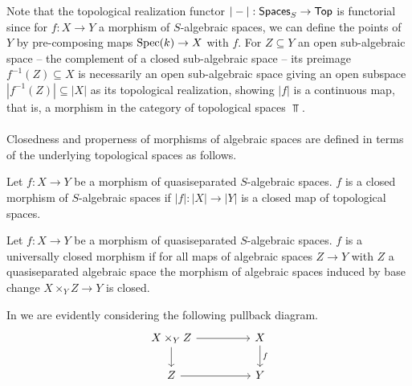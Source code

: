 Note that the topological realization functor $|-|:\mathsf{Spaces}_{S}\to\mathsf{Top}$ is functorial since for $f:X\to Y$ a morphism of $S$-algebraic spaces, we can define the points of $Y$ by pre-composing maps $\operatorname{Spec}(k)\to X$ with $f$. For $Z\subseteq Y$ an open sub-algebraic space -- the complement of a closed sub-algebraic space -- its preimage $f^{-1}(Z)\subseteq X$ is necessarily an open sub-algebraic space giving an open subspace $|f^{-1}(Z)|\subseteq|X|$ as its topological realization, showing $|f|$ is a continuous map, that is, a morphism in the category of topological spaces $\Top$. 
\\\\
Closedness and properness of morphisms of algebraic spaces are defined in terms of the underlying topological spaces as follows. 
\begin{definition}\label{def: closed morphism of algebraic spaces}
    Let $f:X\to Y$ be a morphism of quasiseparated $S$-algebraic spaces. $f$ is a closed morphism of $S$-algebraic spaces if $|f|:|X|\to|Y|$ is a closed map of topological spaces. 
\end{definition}
\begin{definition}\label{def: universally closed morphism of algebraic spaces}
    Let $f:X\to Y$ be a morphism of quasiseparated $S$-algebraic spaces. $f$ is a universally closed morphism if for all maps of algebraic spaces $Z\to Y$ with $Z$ a quasiseparated algebraic space the morphism of algebraic spaces induced by base change $X\times_{Y}Z\to Y$ is closed. 
\end{definition}
\begin{remark}
    In  we are evidently considering the following pullback diagram. 
    $$%
    \begin{tikzcd}
        {X\times_{Y}Z} && X \\
        Z && Y
        \arrow["f", from=1-3, to=2-3]
        \arrow[from=1-1, to=2-1]
        \arrow[from=2-1, to=2-3]
        \arrow[from=1-1, to=1-3]
    \end{tikzcd}$$
\end{remark}

